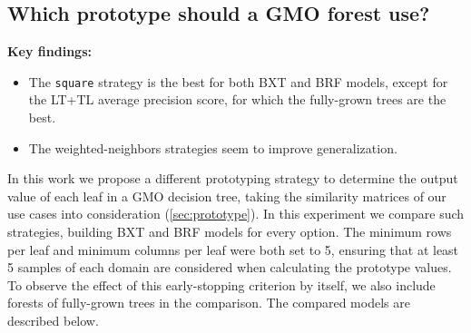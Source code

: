 % 
% 


\subsection{Which prototype should a GMO forest use?}

\label{sec:prototype_comparison}

\begin{mdframed}
    \textbf{Key findings:}
    \begin{itemize}
        \item The \texttt{square} strategy is the best for both BXT and BRF models, except for the LT+TL average precision score, for which the fully-grown trees are the best.
        \item The weighted-neighbors strategies seem to improve generalization.
    \end{itemize}
\end{mdframed}

In this work we propose a different prototyping strategy to determine the output value of each leaf in a GMO decision tree, taking the similarity matrices of our use cases into consideration (\autoref{sec:prototype}).
%
In this experiment we compare such strategies, building BXT and BRF models for every option. The minimum rows per leaf and minimum columns per leaf were both set to 5, ensuring that at least 5 samples of each domain are considered when calculating the prototype values.
%
To observe the effect of this early-stopping criterion by itself, we also include forests of fully-grown trees in the comparison. The compared models are described below.


